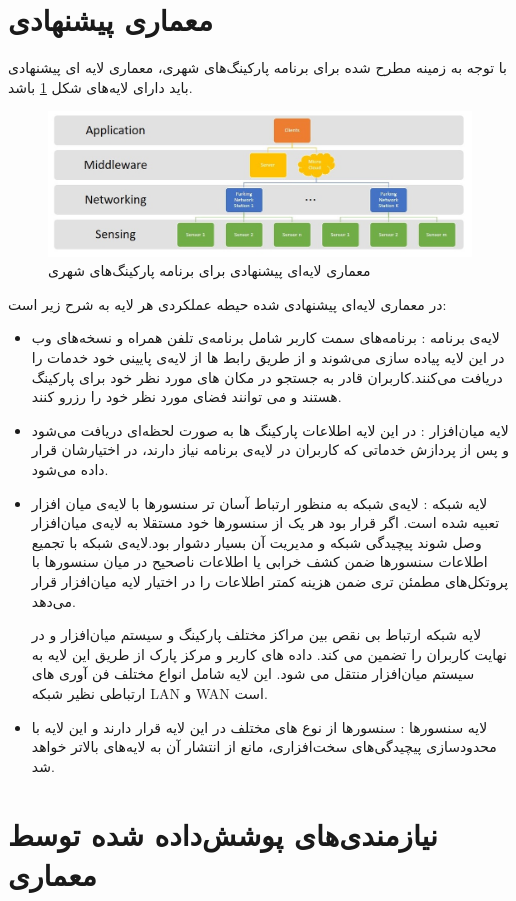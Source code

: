 \section{معماری پیشنهادی}
با توجه به زمینه مطرح شده برای برنامه پارکینگ‌های شهری، معماری لایه ای پیشنهادی باید دارای لایه‌های شکل \ref{fig:parking_layer} باشد.
\begin{figure}[h]
\centering
\includegraphics[scale=0.6]{parking_layer.jpg}
\caption{معماری لایه‌ای پیشنهادی برای برنامه پارکینگ‌های شهری}
\label{fig:parking_layer}
\end{figure}
در معماری لایه‌ای پیشنهادی شده حیطه عملکردی هر لایه به شرح زیر است:
\begin{itemize}
\item
لایه‌ی برنامه : برنامه‌های سمت کاربر شامل برنامه‌ی تلفن همراه و نسخه‌های وب در این لایه پیاده سازی می‌شوند و از طریق رابط ها از لایه‌ی پایینی خود خدمات را دریافت می‌کنند.کاربران قادر به جستجو در مکان های مورد نظر خود برای پارکینگ هستند و می توانند فضای مورد نظر خود را رزرو کنند.
\item
لایه میان‌افزار : در این لایه اطلاعات پارکینگ ها به صورت لحظه‌ای دریافت می‌شود و پس از پردازش خدماتی که کاربران در لایه‌ی برنامه نیاز دارند، در اختیارشان قرار داده می‌شود.
\item
لایه شبکه  : لایه‌ی شبکه به منظور ارتباط آسان تر سنسور‌ها با لایه‌ی میان افزار تعبیه شده است. اگر قرار بود هر یک از سنسور‌ها خود مستقلا به لایه‌ی میان‌افزار وصل شوند پیچیدگی شبکه و مدیریت آن بسیار دشوار بود.لایه‌ی شبکه با تجمیع اطلاعات سنسور‌ها ضمن کشف خرابی یا اطلاعات ناصحیح در میان سنسور‌ها با پروتکل‌های مطمئن تری ضمن هزینه کمتر اطلاعات را در اختیار لایه میان‌افزار قرار می‌دهد.

لایه شبکه ارتباط بی نقص بین مراکز مختلف پارکینگ و سیستم میان‌افزار و در نهایت کاربران را تضمین می کند. داده های کاربر و مرکز پارک از طریق این لایه به سیستم میان‌افزار منتقل می شود. این لایه شامل انواع مختلف فن آوری های ارتباطی نظیر شبکه LAN و WAN است.
\item
لایه سنسور‌ها : سنسور‌ها از نوع های مختلف در این لایه قرار دارند و این لایه با محدود‌سازی پیچیدگی‌های سخت‌افزاری، مانع از انتشار آن به لایه‌های بالاتر خواهد شد.
\end{itemize}
\section{نیازمندی‌های پوشش‌داده شده توسط معماری}
